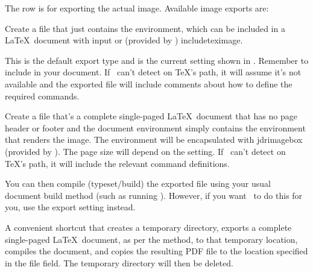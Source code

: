 The  row is for exporting the
actual image. Available image exports are:
\begin{deflist}
\begin{itemdesc}
Create a file that just contains the  environment,
which can be included in a \LaTeX\ document with \gls{input}
or (provided by ) \gls{includeteximage}.

This is the default export type and is the current setting shown in
. Remember to include 
 in your document. If \FlowframTk\ can't detect
 on \TeX's path, it will assume it's not
available and the exported file will include comments about how to
define the required commands.
\end{itemdesc}


\begin{itemdesc}
Create a file that's a complete single-paged \LaTeX\ document that
has no page header or footer and the document environment simply
contains the  environment that renders the image.
The  environment will be encapsulated with
\gls{jdrimagebox} (provided by ).
The page size will depend on the  setting.
If \FlowframTk\ can't detect  on \TeX's path,
it will include the relevant command definitions.

You can then compile (typeset/build) the exported file using your
usual document build method (such as running ).
However, if you want \FlowframTk\ to do this for you, use the 
 export setting instead.
\end{itemdesc}


\begin{itemdesc}
A convenient shortcut that creates a temporary directory, 
exports a complete single-paged \LaTeX\
document, as per the  method, to that
temporary location, compiles the document, and copies the resulting
PDF file to the location specified in the file field. The temporary
directory will then be deleted.
\end{itemdesc}



\end{deflist}
